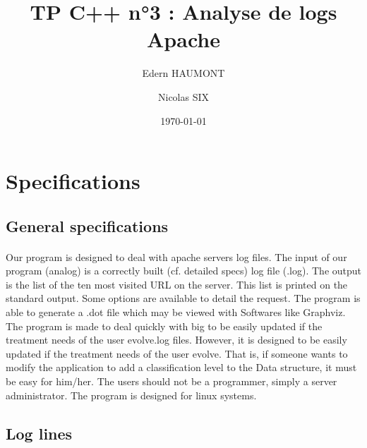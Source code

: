 \documentclass[a4paper, 12pts]{article}
\title{TP C++ n°3 : Analyse de logs Apache}
\author{Edern HAUMONT}
\author{Nicolas SIX}
\affil{B3111}
\date{\today}
\begin{document}

\maketitle



\section{Specifications}
\subsection{General specifications}
\paragraph{}
 Our program is designed to deal with apache servers log files. The input of our program (analog) is a correctly built (cf. detailed specs) log file (.log). The output is the list of the ten most visited URL on the server. This list is printed on the standard output. Some options are available to detail the request. The program is able to generate a .dot file which may be viewed with Softwares like Graphviz.
 The program is made to deal quickly with big to be easily updated if the treatment needs of the user evolve.log files. However, it is designed to be easily updated if the treatment needs of the user evolve. That is, if someone wants to modify the application to add a classification level to the Data structure, it must be easy for him/her. The users should not be a programmer, simply a server administrator.
 The program is designed for linux systems.

\subsection{Log lines}
\end{document}
